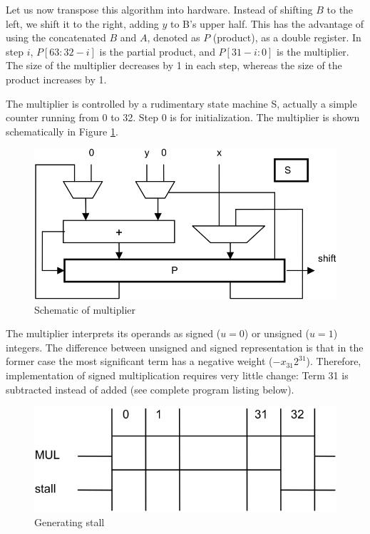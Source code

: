 Let us now transpose this algorithm into hardware. Instead of shifting $B$ to the left, we shift it
to the right, adding $y$ to B's upper half. This has the advantage of using the concatenated $B$ and
$A$, denoted as $P$ (product), as a double register. In step $i$, $P[63:32-i]$ is the partial
product, and $P[31-i:0]$ is the multiplier. The size of the multiplier decreases by 1 in each step,
whereas the size of the product increases by 1.

The multiplier is controlled by a rudimentary state machine S, actually a simple counter running
from 0 to 32. Step 0 is for initialization. The multiplier is shown schematically in Figure \ref{fig:multiplier}.
\begin{figure}[h!]
  \centering
  \includegraphics[width=.9\textwidth]{i/9.png}
  \caption{Schematic of multiplier}
  \label{fig:multiplier}
\end{figure}

The multiplier interprets its operands as signed ($u = 0$) or unsigned ($u = 1$) integers. The
difference between unsigned and signed representation is that in the former case the most
significant term has a negative weight ($-x_{31}2^{31}$). Therefore, implementation of signed
multiplication requires very little change: Term 31 is subtracted instead of added (see
complete program listing below).
\begin{figure}[h!]
  \centering
  \includegraphics[width=.9\textwidth]{i/a.png}
  \caption{Generating stall}
  \label{fig:gs}
\end{figure}


